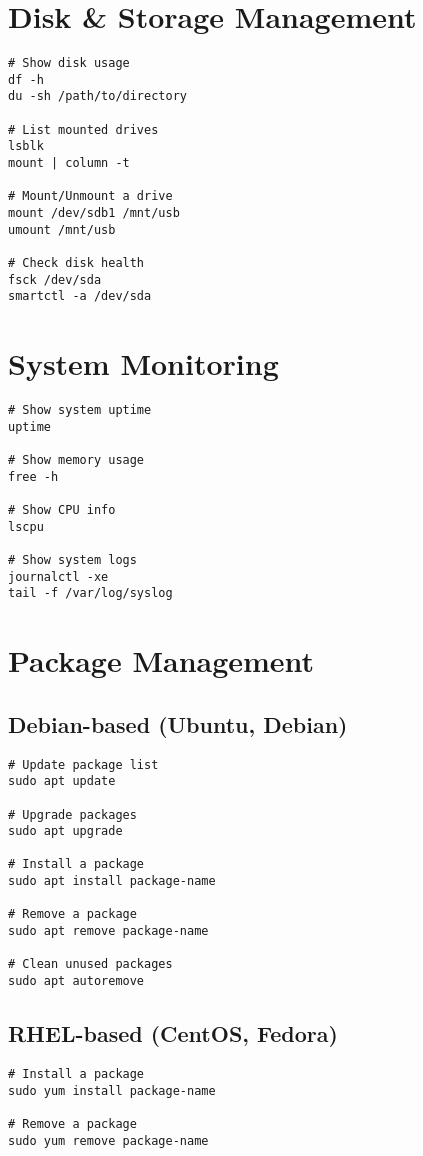 \documentclass[11pt]{article}
\begin{document}
    \section*{Disk & Storage Management}
    \begin{lstlisting}[style=linuxStyle]
# Show disk usage
df -h
du -sh /path/to/directory

# List mounted drives
lsblk
mount | column -t

# Mount/Unmount a drive
mount /dev/sdb1 /mnt/usb
umount /mnt/usb

# Check disk health
fsck /dev/sda
smartctl -a /dev/sda
    \end{lstlisting}

    \section*{System Monitoring}
    \begin{lstlisting}[style=linuxStyle]
# Show system uptime
uptime

# Show memory usage
free -h

# Show CPU info
lscpu

# Show system logs
journalctl -xe
tail -f /var/log/syslog
    \end{lstlisting}

    \section*{Package Management}
    \subsection*{Debian-based (Ubuntu, Debian)}
    \begin{lstlisting}[style=linuxStyle]
# Update package list
sudo apt update

# Upgrade packages
sudo apt upgrade

# Install a package
sudo apt install package-name

# Remove a package
sudo apt remove package-name

# Clean unused packages
sudo apt autoremove
    \end{lstlisting}

    \subsection*{RHEL-based (CentOS, Fedora)}
    \begin{lstlisting}[style=linuxStyle]
# Install a package
sudo yum install package-name

# Remove a package
sudo yum remove package-name
    \end{lstlisting}
\end{document}
